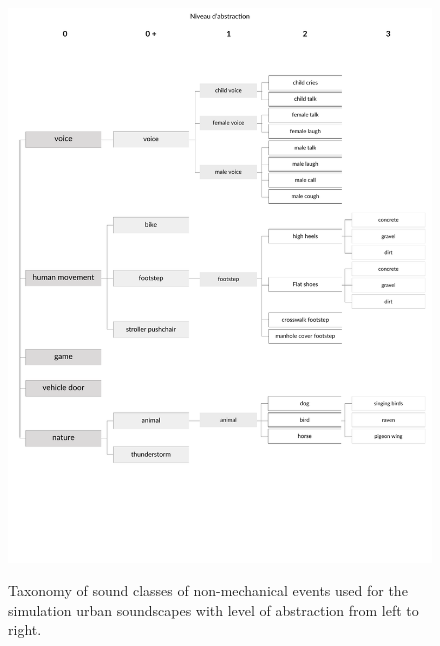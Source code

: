 \documentclass[12pt]{elsarticle}
\begin{document}
\begin{figure}[hp]
    \centering
        {\includegraphics[trim={ 0 0 0cm 1cm},clip,width=.9\columnwidth]{gfx/appendix/event_2_en}\label{fig:taxonomieEventb}}
       \caption{Taxonomy of sound classes of non-mechanical events used for the simulation urban soundscapes with level of abstraction from left to right.}
       \label{fig:taxonomieEb}
\end{figure}
\end{document}
